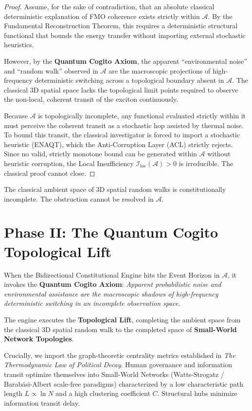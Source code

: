 \documentclass[11pt,openany]{extbook}
\theoremstyle{plain}
\theoremstyle{definition}
\begin{document}
\begin{proof}
Assume, for the sake of contradiction, that an absolute classical deterministic explanation of FMO coherence exists strictly within $\mathcal{A}$. By the Fundamental Reconstruction Theorem, this requires a deterministic structural functional that bounds the energy transfer without importing external stochastic heuristics.

However, by the \textbf{Quantum Cogito Axiom}, the apparent ``environmental noise'' and ``random walk'' observed in $\mathcal{A}$ are the macroscopic projections of high-frequency deterministic switching across a topological boundary absent in $\mathcal{A}$. The classical 3D spatial space lacks the topological limit points required to observe the non-local, coherent transit of the exciton continuously.

Because $\mathcal{A}$ is topologically incomplete, any functional evaluated strictly within it must perceive the coherent transit as a stochastic hop assisted by thermal noise. To bound this transit, the classical investigator is forced to import a stochastic heuristic (ENAQT), which the Anti-Corruption Layer (ACL) strictly rejects. Since no valid, strictly monotone bound can be generated within $\mathcal{A}$ without heuristic corruption, the Local Insufficiency $\mathcal{I}_{\text{loc}}(\mathcal{A}) > 0$ is irreducible. The classical proof cannot close.
\end{proof}

The classical ambient space of 3D spatial random walks is constitutionally incomplete. The obstruction cannot be resolved in $\mathcal{A}$.

\section{Phase II: The Quantum Cogito Topological Lift}

When the Bidirectional Constitutional Engine hits the Event Horizon in $\mathcal{A}$, it invokes the \textbf{Quantum Cogito Axiom}: \textit{Apparent probabilistic noise and environmental assistance are the macroscopic shadows of high-frequency deterministic switching in an incomplete observation space.}

The engine executes the \textbf{Topological Lift}, completing the ambient space from the classical 3D spatial random walk to the completed space of \textbf{Small-World Network Topologies}.

Crucially, we import the graph-theoretic centrality metrics established in \textit{The Thermodynamic Law of Political Decay}. Human governance and information transit optimize themselves into Small-World Networks (Watts-Strogatz / Barab\'asi-Albert scale-free paradigms) characterized by a low characteristic path length $L \propto \ln N$ and a high clustering coefficient $C$. Structural hubs minimize information transit delay.
\end{document}
